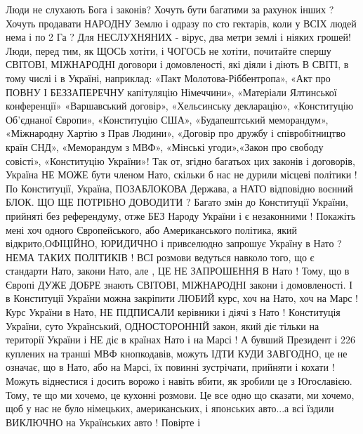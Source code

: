 \begin{itemize}
\begin{itemize}
\end{itemize}

 

Люди не слухають Бога і законів? Хочуть бути багатими за рахунок інших ? Хочуть
продавати НАРОДНУ Землю і одразу по сто гектарів, коли у ВСІХ людей нема і по 2
Га ? Для НЕСЛУХНЯНИХ - вірус, два метри землі і ніяких грошей! Люди, перед тим,
як ЩОСЬ хотіти, і ЧОГОСЬ не хотіти, почитайте спершу СВІТОВІ, МІЖНАРОДНІ
договори і домовленості, які діяли і діють В СВІТІ, в тому числі і в Україні,
наприклад: «Пакт Молотова-Ріббентропа», «Акт про ПОВНУ І БЕЗЗАПЕРЕЧНУ
капітуляцію Німеччини», «Матеріали Ялтинської конференції» «Варшавський
договір», «Хельсинську декларацію», «Конституцію Об’єднаної Європи»,
«Конституцію США», «Будапештський меморандум», «Міжнародну Хартію з Прав
Людини», «Договір про дружбу і співробітництво країн СНД», «Меморандум з МВФ»,
«Мінські угоди»,«Закон про свободу совісті», «Конституцію України»! Так от,
згідно багатьох цих законів і договорів, Україна НЕ МОЖЕ бути членом Нато,
скільки б нас не дурили місцеві політики ! По Конституції, Україна, ПОЗАБЛОКОВА
Держава, а НАТО відповідно воєнний БЛОК. ЩО ЩЕ ПОТРІБНО ДОВОДИТИ ? Багато змін
до Конституції України, прийняті без референдуму, отже БЕЗ Народу України і є
незаконними ! Покажіть мені хоч одного Європейського, або Американського
політика, який відкрито,ОФІЦІЙНО, ЮРИДИЧНО і привселюдно запрошує Україну в
Нато ? НЕМА ТАКИХ ПОЛІТИКІВ ! ВСІ розмови ведуться навколо того, що є стандарти
Нато, закони Нато, але , ЦЕ НЕ ЗАПРОШЕННЯ В Нато ! Тому, що в Європі ДУЖЕ ДОБРЕ
знають СВІТОВІ, МІЖНАРОДНІ закони і домовленості. І в Конституції України можна
закріпити ЛЮБИЙ курс, хоч на Нато, хоч на Марс ! Курс України в Нато, НЕ
ПІДПИСАЛИ керівники і діячі з Нато ! Конституція України, суто Український,
ОДНОСТОРОННІЙ закон, який діє тільки на території України і НЕ діє в країнах
Нато і на Марсі ! А бувший Президент і 226 куплених на транші МВФ кнопкодавів,
можуть ІДТИ КУДИ ЗАВГОДНО, це не означає, що в Нато, або на Марсі, їх повинні
зустрічати, прийняти і кохати ! Можуть віднестися і досить ворожо і навіть
вбити, як зробили це з Югославією. Тому, те що ми хочемо, це кухонні розмови.
Це все одно що сказати, ми хочемо, щоб у нас не було німецьких, американських,
і японських авто...а всі їздили ВИКЛЮЧНО на Українських авто ! Повірте і

\end{itemize}
